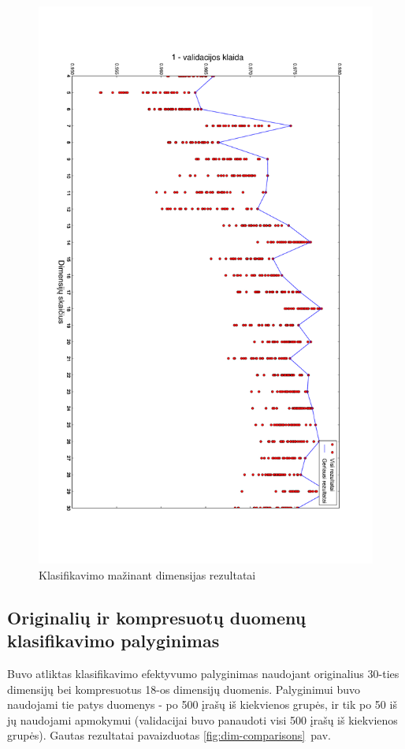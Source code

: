 \documentclass{VUMIFPSbakalaurinis}
\begin{document}
\begin{figure}
	\includegraphics[scale=0.32]{pics/dimensions_2015-5-27_6-18-5}
	\caption{Klasifikavimo mažinant dimensijas rezultatai}
	\label{fig:experiment-2}
\end{figure}


\subsection{Originalių ir kompresuotų duomenų klasifikavimo palyginimas}

Buvo atliktas klasifikavimo efektyvumo palyginimas naudojant originalius 30-ties dimensijų bei kompresuotus 18-os dimensijų duomenis.
Palyginimui buvo naudojami tie patys duomenys - po 500 įrašų iš kiekvienos grupės, ir tik po 50 iš jų naudojami apmokymui (validacijai buvo panaudoti visi 500 įrašų iš kiekvienos grupės).
Gautas rezultatai pavaizduotas \ref{fig:dim-comparisons}~pav.
\end{document}
